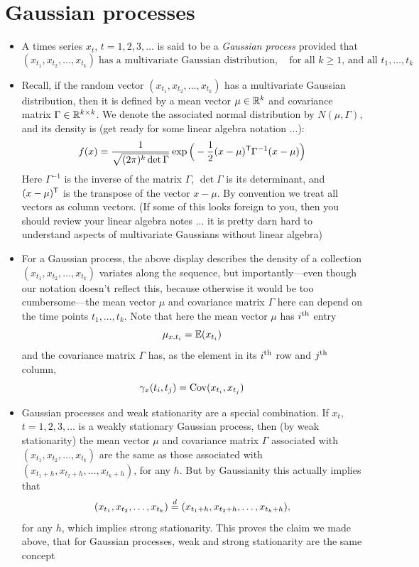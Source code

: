 \documentclass{article}
\begin{document}

\section{Gaussian processes}

\begin{itemize}
\item A times series $x_t$, $t = 1,2,3,\dots$ is said to be a \emph{Gaussian
    process} provided that  
  \[
  (x_{t_1}, x_{t_2}, \dots, x_{t_k}) \; \text{has a multivariate Gaussian
    distribution}, \quad \text{for all $k \geq 1$, and all $t_1,\dots,t_k$} 
  \]

\item Recall, if the random vector $(x_{t_1}, x_{t_2}, \dots, x_{t_k})$ has a 
  multivariate Gaussian distribution, then it is defined by a mean vector $\mu
  \in \mathbb{R}^k$ and covariance matrix $\Gamma \in \mathbb{R}^{k \times k}$. We denote the 
  associated normal distribution by $N(\mu, \Gamma)$, and its density is (get
  ready for some linear algebra notation ...):
  \[
  f(x) = \frac{1}{\sqrt{(2\pi)^k \det \Gamma}} \exp \Big( -
  \frac{1}{2} (x - \mu)^{\mathsf{T}} \Gamma^{-1} ( x - \mu ) \Big) 
  \]
  Here $\Gamma^{-1}$ is the inverse of the matrix $\Gamma$, $\det \Gamma$ is its
  determinant, and $(x-\mu)^{\mathsf{T}}$ is the transpose of the vector $x-\mu$.
  By convention we treat all vectors as column vectors. (If some of this looks
  foreign to you, then you should review your linear algebra notes ... it is
  pretty darn hard to understand aspects of multivariate Gaussians without 
  linear algebra) 

\item For a Gaussian process, the above display describes the density of a
  collection $(x_{t_1}, x_{t_2}, \dots, x_{t_k})$ variates along the sequence,
  but importantly---even though our notation doesn't reflect this, because
  otherwise it would be too cumbersome---the mean vector $\mu$ and covariance
  matrix $\Gamma$ here can depend on the time points $t_1,\dots,t_k$. Note that
  here the mean vector $\mu$ has $i^{\textnormal{th}}$ entry
  \[
  \mu_{x.t_i} = \mathbb{E}(x_{t_i})
  \]
  and the covariance matrix $\Gamma$ has, as the element in its $i^{\textnormal{th}}$ row and
  $j^{\textnormal{th}}$ column, 
  \[
  \gamma_x(t_i, t_j) = \operatorname{Cov}(x_{t_i}, x_{t_j})
  \]

\item Gaussian processes and weak stationarity are a special combination. If
  $x_t$, $t = 1,2,3,\dots$ is a weakly stationary Gaussian process, then (by
  weak stationarity) the mean vector $\mu$ and covariance matrix $\Gamma$
  associated with $(x_{t_1}, x_{t_2}, \dots, x_{t_k})$ are the same as those
  associated with $(x_{t_1+h}, x_{t_2+h}, \dots, x_{t_k+h})$, for any $h$. But
  by Gaussianity this actually implies that
  \[
  (x_{t_1}, x_{t_2}, \dots, x_{t_k}) \overset{d}{=} (x_{t_1+h}, x_{t_2+h}, \dots,
  x_{t_k+h}),
  \]
  for any $h$, which implies strong stationarity. This proves the claim we made
  above, that for Gaussian processes, weak and strong stationarity are the same
  concept 
\end{itemize}
\end{document}
